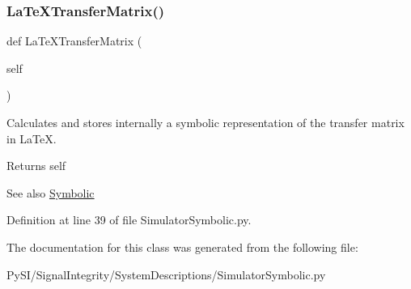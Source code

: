 \mbox{\label{classSignalIntegrity_1_1SystemDescriptions_1_1SimulatorSymbolic_1_1SimulatorSymbolic_adc83c150e43916083e3379cd4b9bb80e}} 
\subsubsection{\texorpdfstring{La\+Te\+X\+Transfer\+Matrix()}{LaTeXTransferMatrix()}}
{\footnotesize\ttfamily def La\+Te\+X\+Transfer\+Matrix (\begin{DoxyParamCaption}\item[{}]{self }\end{DoxyParamCaption})}



Calculates and stores internally a symbolic representation of the transfer matrix in La\+TeX. 

\begin{DoxyReturn}{Returns}
self 
\end{DoxyReturn}
\begin{DoxySeeAlso}{See also}
\hyperlink{namespaceSignalIntegrity_1_1SystemDescriptions_1_1Symbolic}{Symbolic} 
\end{DoxySeeAlso}


Definition at line 39 of file Simulator\+Symbolic.\+py.



The documentation for this class was generated from the following file\+:\begin{DoxyCompactItemize}
\item 
Py\+S\+I/\+Signal\+Integrity/\+System\+Descriptions/Simulator\+Symbolic.\+py\end{DoxyCompactItemize}
